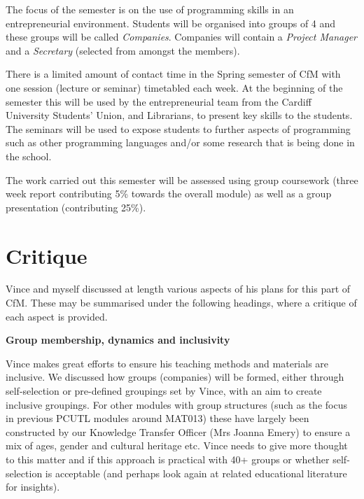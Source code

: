\documentclass[a4paper,12pt]{article}
\begin{document}
The focus of the semester is on the use of programming skills in an entrepreneurial environment.  Students will be organised into groups of 4 and these groups will be called \emph{Companies}. Companies will contain a \emph{Project Manager} and a \emph{Secretary} (selected from amongst the members).

There is a limited amount of contact time in the Spring semester of CfM with one session (lecture or seminar) timetabled each week. At the beginning of the semester this will be used by the entrepreneurial team from the Cardiff University Students’ Union, and Librarians, to present key skills to the students. The seminars will be used to expose students to further aspects of programming such as other programming languages and/or some research that is being done in the school.

The work carried out this semester will be assessed using group coursework (three week report contributing 5\% towards the overall module) as well as a group presentation (contributing 25\%).


\section{Critique}

Vince and myself discussed at length various aspects of his plans for this part of CfM.  These may be  summarised under the following headings, where a critique of each aspect is provided.

\textbf{Group membership, dynamics and inclusivity}

Vince makes great efforts to ensure his teaching methods and materials are inclusive. We discussed how groups (companies) will be formed, either through self-selection or pre-defined groupings set by Vince, with an aim to create inclusive groupings. For other modules with group structures (such as the focus in previous PCUTL modules around MAT013) these have largely been constructed by our Knowledge Transfer Officer (Mrs Joanna Emery) to ensure a mix of ages, gender and cultural heritage etc. Vince needs to give more thought to this matter and if this approach is practical with 40+ groups or whether self-selection is acceptable (and perhaps look again at related educational literature for insights).
\end{document}
